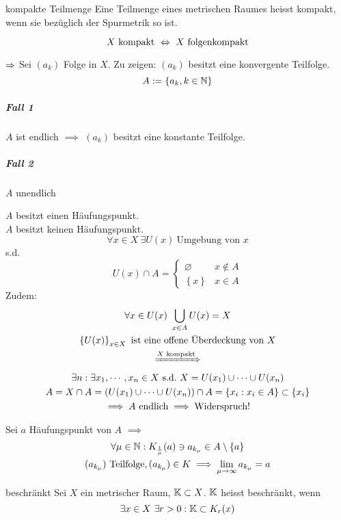 \begin{Def}{kompakte Teilmenge}
  Eine Teilmenge eines metrischen Raumes heisst kompakt, wenn sie bezüglich der Spurmetrik so ist.
\end{Def}
\begin{Sat}
  \[X\ \text{kompakt}\ \Lra\ X\ \text{folgenkompakt}\]
\end{Sat}
\begin{Bew}
  $\Rightarrow$ Sei $(a_k)$ Folge in $X$. Zu zeigen: $(a_k)$ besitzt eine konvergente Teilfolge.
  \[A:=\left\{ a_k,k\in\mathbb{N} \right\}\]
  \subparagraph{Fall 1}$A$ ist endlich $\implies$ $(a_k)$ besitzt eine konstante Teilfolge.
  \subparagraph{Fall 2}$A$ unendlich
  \begin{Lem}
    $A$ besitzt einen Häufungspunkt.\\
    $A$ besitzt keinen Häufungspunkt.
    \[\forall x\in X\ \exists U(x)\ \text{Umgebung von $x$}\]
    s.d.
    \[U(x)\cap A=\begin{cases}
      \varnothing&x\not\in A\\
      \left\{ x \right\}&x\in A
    \end{cases}\]
    Zudem:
    \begin{gather*}
    \forall x\in U(x)\ \bigcup_{x\in A}U(x)=X\\
    \left\{ U(x) \right\}_{x\in X}\ \text{ist eine offene Überdeckung von $X$}\\
    \xRightarrow{\text{$X$ kompakt}}\\
    \exists n:\exists x_1,\cdots,x_n\in X\ \text{s.d.}\ X=U(x_1)\cup\cdots\cup U(x_n)\\
    A=X\cap A=\left( U(x_1)\cup\cdots\cup U(x_n) \right)\cap A=\left\{ x_i:x_i\in A \right\}\subset \left\{ x_i \right\}\\
    \implies A\ \text{endlich}\implies \text{Widerspruch!}
    \end{gather*}
  \end{Lem}
  Sei $a$ Häufungspunkt von $A$ $\implies$
  \begin{gather*}
    \forall\mu\in \mathbb{N}:K_{\frac{1}{\mu}}(a)\ni a_{k_\mu}\in A\setminus\left\{ a \right\}\\
    (a_{k_\mu})\ \text{Teilfolge}, (a_{k_\mu})\in K \implies \displaystyle\lim_{\mu\rightarrow\infty}a_{k_\mu}=a
  \end{gather*}
\end{Bew}
\begin{Def}{beschränkt}
  Sei $X$ ein metrischer Raum, $\mathbb{K}\subset X$. $\mathbb{K}$ heisst beschränkt, wenn 
  \[\exists x\in X\ \exists r>0:\mathbb{K}\subset K_r(x)\]
\end{Def}
